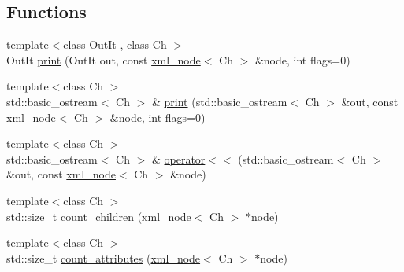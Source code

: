 \subsection*{Functions}
\begin{DoxyCompactItemize}
\item 
{\footnotesize template$<$class Out\+It , class Ch $>$ }\\Out\+It \hyperlink{namespacerapidxml_a0fb0be6eba49fb2e2646d5a72a0dc355}{print} (Out\+It out, const \hyperlink{classrapidxml_1_1xml__node}{xml\+\_\+node}$<$ Ch $>$ \&node, int flags=0)
\item 
{\footnotesize template$<$class Ch $>$ }\\std\+::basic\+\_\+ostream$<$ Ch $>$ \& \hyperlink{namespacerapidxml_a0d2e114d5dd85e13c23b8dab600720fe}{print} (std\+::basic\+\_\+ostream$<$ Ch $>$ \&out, const \hyperlink{classrapidxml_1_1xml__node}{xml\+\_\+node}$<$ Ch $>$ \&node, int flags=0)
\item 
{\footnotesize template$<$class Ch $>$ }\\std\+::basic\+\_\+ostream$<$ Ch $>$ \& \hyperlink{namespacerapidxml_a9ed8e626dd81348caede1f92a6c8418a}{operator$<$$<$} (std\+::basic\+\_\+ostream$<$ Ch $>$ \&out, const \hyperlink{classrapidxml_1_1xml__node}{xml\+\_\+node}$<$ Ch $>$ \&node)
\item 
{\footnotesize template$<$class Ch $>$ }\\std\+::size\+\_\+t \hyperlink{namespacerapidxml_a21c1cf2814019385e6b8d09e75af1d34}{count\+\_\+children} (\hyperlink{classrapidxml_1_1xml__node}{xml\+\_\+node}$<$ Ch $>$ $\ast$node)
\item 
{\footnotesize template$<$class Ch $>$ }\\std\+::size\+\_\+t \hyperlink{namespacerapidxml_a6255d15e5d8ad12ebcd7c60da51c97e2}{count\+\_\+attributes} (\hyperlink{classrapidxml_1_1xml__node}{xml\+\_\+node}$<$ Ch $>$ $\ast$node)
\end{DoxyCompactItemize}
